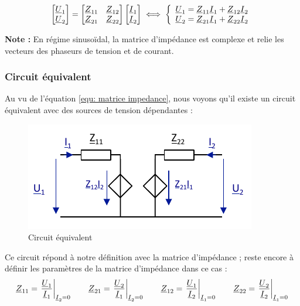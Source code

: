 \documentclass[12pt,a4paper]{article}
\newcommand{\uz}{\uline{Z} }
\newcommand{\ui}{\uline{I} }
\newcommand{\uu}{\uline{U} }
\begin{document}
\begin{equation}
	\begin{bmatrix}
	\uu_1\\
	\uu_2
	\end{bmatrix} = 
	\begin{bmatrix}
		\uz_{11} & \uz_{12}\\
		\uz_{21} & \uz_{22}
	\end{bmatrix} \begin{bmatrix}
	\ui_1\\
	\ui_2
	\end{bmatrix} \iff \left\{\begin{array}{l}
\uu_1 = \uz_{11}\ui_1 + \uz_{12}\ui_2\\
\uu_2 = \uz_{21}\ui_1 + \uz_{22}\ui_2
\end{array}\right.
\label{equ: matrice impedance}
\end{equation}
\begin{boite}
	\textbf{Note :} En régime sinusoïdal, la matrice d'impédance est complexe et relie les vecteurs des phaseurs de tension et de courant.
\end{boite}

\subsubsection{Circuit équivalent}
Au vu de l'équation \ref{equ: matrice impedance}, nous voyons qu'il existe un circuit équivalent avec des sources de tension dépendantes :
\begin{figure}[!h]
	\centering
	\includegraphics[scale=0.65]{images/circuit_equi_imped}
	\caption{Circuit équivalent}
\end{figure}

Ce circuit répond à notre définition avec la matrice d'impédance ; reste encore à définir les paramètres de la matrice d'impédance dans ce cas :
\begin{equation}
	\uz_{11} = \left.\frac{\uu_1}{\ui_1}\right|_{\ui_2 = 0} \qquad
	\uz_{21} = \left.\frac{\uu_2}{\ui_1}\right|_{\ui_2 = 0} \qquad
	\uz_{12} = \left.\frac{\uu_1}{\ui_2}\right|_{\ui_1 = 0} \qquad
	\uz_{22} = \left.\frac{\uu_2}{\ui_2}\right|_{\ui_1 = 0}
\end{equation}
\end{document}
